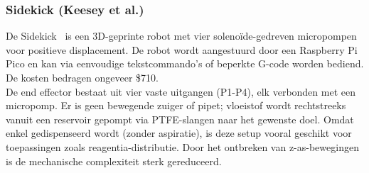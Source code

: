 \subsubsection{Sidekick (Keesey et al.)} 
De Sidekick\ \cite{RN41} is een 3D-geprinte robot met vier solenoïde-gedreven micropompen voor positieve displacement. De robot wordt aangestuurd door een Raspberry Pi Pico en kan via eenvoudige tekstcommando’s of beperkte G-code worden bediend. De kosten bedragen ongeveer \$710.\\[12pt]De end effector bestaat uit vier vaste uitgangen (P1-P4), elk verbonden met een micropomp. Er is geen bewegende zuiger of pipet; vloeistof wordt rechtstreeks vanuit een reservoir gepompt via PTFE-slangen naar het gewenste doel. Omdat enkel gedispenseerd wordt (zonder aspiratie), is deze setup vooral geschikt voor toepassingen zoals reagentia-distributie. Door het ontbreken van z-as-bewegingen is de mechanische complexiteit sterk gereduceerd.

